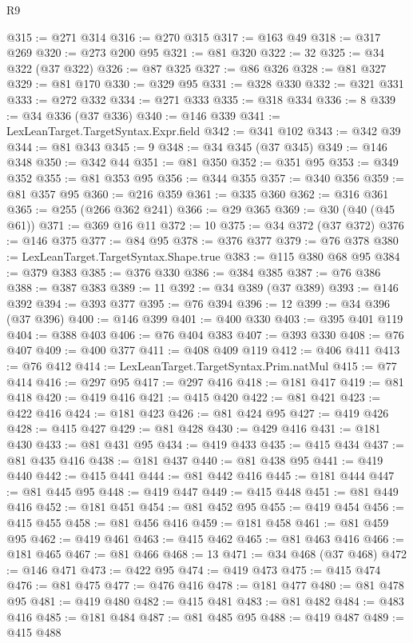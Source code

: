 \begin{lexlean}{R9}
\begin{coremodule}
@315 := @271 @314
@316 := @270 @315
@317 := @163 @49
@318 := @317 @269
@320 := @273 @200 @95
@321 := @81 @320
@322 := 32
@325 := @34 @322 (@37 @322)
@326 := @87 @325
@327 := @86 @326
@328 := @81 @327
@329 := @81 @170
@330 := @329 @95
@331 := @328 @330
@332 := @321 @331
@333 := @272 @332
@334 := @271 @333
@335 := @318 @334
@336 := 8
@339 := @34 @336 (@37 @336)
@340 := @146 @339
@341 := LexLeanTarget.TargetSyntax.Expr.field
@342 := @341 @102
@343 := @342 @39
@344 := @81 @343
@345 := 9
@348 := @34 @345 (@37 @345)
@349 := @146 @348
@350 := @342 @44
@351 := @81 @350
@352 := @351 @95
@353 := @349 @352
@355 := @81 @353 @95
@356 := @344 @355
@357 := @340 @356
@359 := @81 @357 @95
@360 := @216 @359
@361 := @335 @360
@362 := @316 @361
@365 := @255 (@266 @362 @241)
@366 := @29 @365
@369 := @30 (@40 (@45 @61))
@371 := @369 @16 @11
@372 := 10
@375 := @34 @372 (@37 @372)
@376 := @146 @375
@377 := @84 @95
@378 := @376 @377
@379 := @76 @378
@380 := LexLeanTarget.TargetSyntax.Shape.true
@383 := @115 @380 @68 @95
@384 := @379 @383
@385 := @376 @330
@386 := @384 @385
@387 := @76 @386
@388 := @387 @383
@389 := 11
@392 := @34 @389 (@37 @389)
@393 := @146 @392
@394 := @393 @377
@395 := @76 @394
@396 := 12
@399 := @34 @396 (@37 @396)
@400 := @146 @399
@401 := @400 @330
@403 := @395 @401 @119
@404 := @388 @403
@406 := @76 @404 @383
@407 := @393 @330
@408 := @76 @407
@409 := @400 @377
@411 := @408 @409 @119
@412 := @406 @411
@413 := @76 @412
@414 := LexLeanTarget.TargetSyntax.Prim.natMul
@415 := @77 @414
@416 := @297 @95
@417 := @297 @416
@418 := @181 @417
@419 := @81 @418
@420 := @419 @416
@421 := @415 @420
@422 := @81 @421
@423 := @422 @416
@424 := @181 @423
@426 := @81 @424 @95
@427 := @419 @426
@428 := @415 @427
@429 := @81 @428
@430 := @429 @416
@431 := @181 @430
@433 := @81 @431 @95
@434 := @419 @433
@435 := @415 @434
@437 := @81 @435 @416
@438 := @181 @437
@440 := @81 @438 @95
@441 := @419 @440
@442 := @415 @441
@444 := @81 @442 @416
@445 := @181 @444
@447 := @81 @445 @95
@448 := @419 @447
@449 := @415 @448
@451 := @81 @449 @416
@452 := @181 @451
@454 := @81 @452 @95
@455 := @419 @454
@456 := @415 @455
@458 := @81 @456 @416
@459 := @181 @458
@461 := @81 @459 @95
@462 := @419 @461
@463 := @415 @462
@465 := @81 @463 @416
@466 := @181 @465
@467 := @81 @466
@468 := 13
@471 := @34 @468 (@37 @468)
@472 := @146 @471
@473 := @422 @95
@474 := @419 @473
@475 := @415 @474
@476 := @81 @475
@477 := @476 @416
@478 := @181 @477
@480 := @81 @478 @95
@481 := @419 @480
@482 := @415 @481
@483 := @81 @482
@484 := @483 @416
@485 := @181 @484
@487 := @81 @485 @95
@488 := @419 @487
@489 := @415 @488

\end{coremodule}
\end{lexlean}
